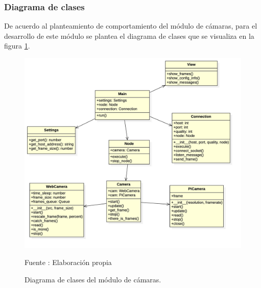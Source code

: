 \subsubsection{Diagrama de clases}
De acuerdo al planteamiento de comportamiento del módulo de cámaras, para el desarrollo de este módulo se plantea el diagrama de clases que se visualiza en la figura \ref{fig:camera_clases}.\\

\begin{figure}[H]
    \begin{center}
        \includegraphics[width=15cm]{img/capitulo_4/camera_clases.jpg}
        \caption{Diagrama de clases del módulo de cámaras.}
        Fuente : Elaboración propia
        \label{fig:camera_clases}
    \end{center}
\end{figure}


